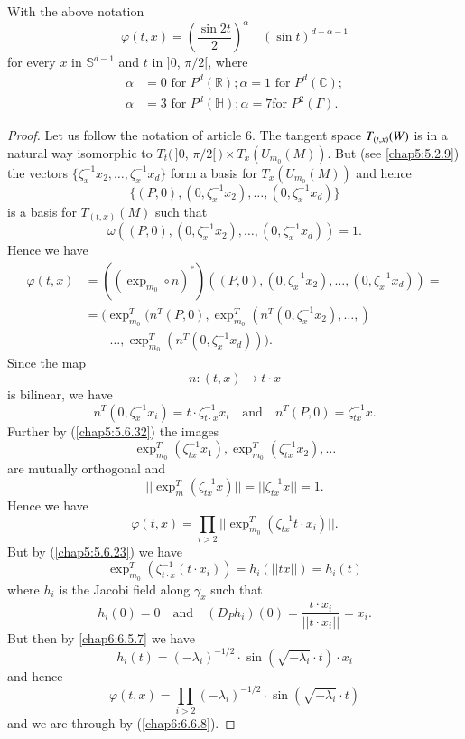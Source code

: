\subsection{}\label{chap6:6.7.1}

\begin{lemma*}
With the above notation
$$
\varphi(t,x)=\left(\frac{\sin 2t}{2}\right)^{\alpha}\quad (\sin
t)^{d-\alpha-1}
$$
for every $x$ in $\mathbb{S}^{d-1}$ and $t$ in $]0$, $\pi/2[$, where
\begin{align*}
\alpha &= 0\text{ \ for \ } P^{d}(\mathbb{R});\alpha=1\text{ \ for \ }
P^{d}(\mathbb{C});\\
\alpha &= 3 \text{ \ for \ } P^{d}(\mathbb{H});\alpha = 7 \text{
  \  for \ } P^{2}(\Gamma).
\end{align*}\pageoriginale
\end{lemma*}

\begin{proof}
Let us follow the notation of article 6. The tangent space
$T_{(t,x)}\unskip\break (W)$ is in a natural way isomorphic to $T_{t}(\,]0$,
    $\pi/2[\,)\times T_{x}(U_{m_{0}}(M))$. But (see \ref{chap5:5.2.9}) the
      vectors $\{\zeta^{-1}_{x}x_{2},\ldots,\zeta^{-1}_{x}x_{d}\}$
      form a basis for $T_{x}(U_{m_{0}}(M))$ and hence
$$
\{(P,0),(0,\zeta^{-1}_{x}x_{2}),\ldots,(0,\zeta^{-1}_{x}x_{d})\}
$$
is a basis for $T_{(t,x)}(M)$ such that
$$
\omega((P,0),(0,\zeta^{-1}_{x}x_{2}),\ldots,(0,\zeta^{-1}_{x}x_{d}))=1.
$$
Hence we have
\begin{align*}
\varphi(t,x) &= ((\exp_{m_{0}}\circ
n)^{\ast})((P,0),(0,\zeta^{-1}_{x}x_{2}),\ldots,(0,\zeta^{-1}_{x}x_{d}))=\\ 
&=
(\exp^{T}_{m_{0}}(n^{T}(P,0),\exp^{T}_{m_{0}}(n^{T}(0,\zeta^{-1}_{x}x_{2}),\ldots,)\\
&\qquad\ldots,\exp^{T}_{m_{0}}(n^{T}(0,\zeta^{-1}_{x}x_{d}))). 
\end{align*}
Since the map
$$
n:(t,x)\to t\cdot x
$$
is bilinear, we have
$$
n^{T}(0,\zeta^{-1}_{x}x_{i})=t\cdot \zeta^{-1}_{t\cdot
  x}x_{i}\quad\text{and}\quad n^{T}(P,0)=\zeta^{-1}_{tx}x.
$$
Further by (\ref{chap5:5.6.32}) the images
$$
\exp^{T}_{m_{0}}(\zeta^{-1}_{tx}x_{1}),\exp^{T}_{m_{0}}(\zeta^{-1}_{tx}x_{2}),\ldots 
$$
are mutually orthogonal and
$$
||\exp^{T}_{m}(\zeta^{-1}_{tx}x)||=||\zeta^{-1}_{tx}x||=1.
$$\pageoriginale
Hence we have
$$
\varphi(t,x)=\prod_{i>2}||\exp^{T}_{m_{0}}(\zeta^{-1}_{tx}t\cdot
x_{i})||. 
$$
But by (\ref{chap5:5.6.23}) we have
$$
\exp^{T}_{m_{0}}(\zeta^{-1}_{t\cdot x}(t\cdot x_{i}))=h_{i}(||tx||)=h_{i}(t)
$$
where $h_{i}$ is the Jacobi field along $\gamma_{x}$ such that
$$
h_{i}(0)=0\quad\text{and}\quad (D_{P}h_{i})(0)=\frac{t\cdot
  x_{i}}{||t\cdot x_{i}||}=x_{i}. 
$$
But then by \eqref{chap6:6.5.7} we have
$$
h_{i}(t)=(-\lambda_{i})^{-1/2}\cdot \sin(\sqrt{-\lambda_{i}}\cdot
t)\cdot x_{i}
$$
and hence
\begin{equation*}
\varphi(t,x)=\prod_{i>2}(-\lambda_{i})^{-1/2}\cdot \sin
(\sqrt{-\lambda_{i}}\cdot t)\tag{6.7.2}\label{chap6:6.7.2}
\end{equation*}
and we are through by (\ref{chap6:6.6.8}).
\end{proof}

